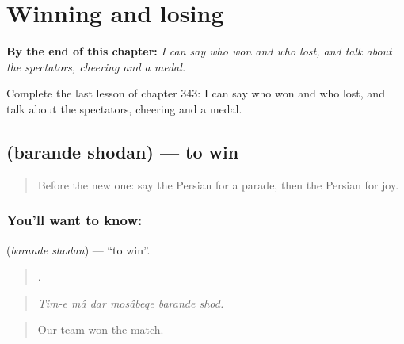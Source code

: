 
\chapter{Winning and losing}
\label{ch:fa-winning-and-losing}

\begin{chapteropening}
\textbf{By the end of this chapter:} \emph{I can say who won and who lost, and talk about the spectators, cheering and a medal.}

Complete the last lesson of chapter 343: I can say who won and who lost, and talk about the spectators, cheering and a medal.
\end{chapteropening}

\section[\texorpdfstring{\fa{برنده} \fa{شدن} (barande shodan)}{برنده شدن (barande shodan)}]{  (barande shodan) — to win}

\label{lesson:FA-C343-barande-shodan}



\begin{quote}
Before the new one: say the Persian for a parade, then the Persian for joy.
\end{quote}

\subsection*{You'll want to know:  }
\textbf{ } (\emph{barande shodan}) — \textquotedblleft{}to win\textquotedblright{}.

\begin{quote}
     .
\end{quote}

\begin{quote}
\emph{Tim-e mâ dar mosâbeqe barande shod.}
\end{quote}

\begin{quote}
Our team won the match.
\end{quote}

